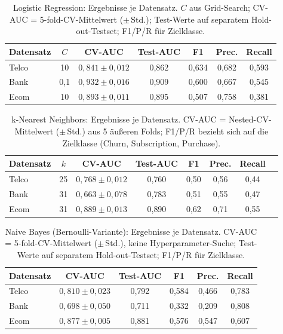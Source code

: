 \documentclass[10pt]{scrartcl}
\begin{document}
\begin{table}[H]
\centering
\footnotesize
\setlength{\tabcolsep}{4pt}
\caption{Logistic Regression: Ergebnisse je Datensatz. $C$ aus Grid-Search; CV-AUC = 5-fold-CV-Mittelwert ($\pm$\,Std.); Test-Werte auf separatem Hold-out-Testset; F1/P/R für Zielklasse.}\label{tab:logreg-results}
\begin{tabular}{lcccccc}
\toprule
Datensatz & $C$ & CV-AUC & Test-AUC & F1 & Prec. & Recall \\
\midrule
Telco & 10 & $0{,}841 \pm 0{,}012$ & 0{,}862 & 0{,}634 & 0{,}682 & 0{,}593 \\
Bank  & 0,1 & $0{,}932 \pm 0{,}016$ & 0{,}909 & 0{,}600 & 0{,}667 & 0{,}545 \\
Ecom  & 10 & $0{,}893 \pm 0{,}011$ & 0{,}895 & 0{,}507 & 0{,}758 & 0{,}381 \\
\bottomrule
\end{tabular}
\end{table}

\begin{table}[H]
\centering
\footnotesize
\setlength{\tabcolsep}{4pt}
\caption{k-Nearest Neighbors: Ergebnisse je Datensatz. CV-AUC = Nested-CV-Mittelwert ($\pm$\,Std.) aus 5 äußeren Folds; F1/P/R bezieht sich auf die Zielklasse (Churn, Subscription, Purchase).}\label{tab:knn-results}
\begin{tabular}{lccccccc}
\toprule
Datensatz & $k$ & CV-AUC & Test-AUC & F1 & Prec. & Recall \\
\midrule
Telco   & 25 & $0{,}768 \pm 0{,}012$ & 0{,}760 & 0{,}50 & 0{,}56 & 0{,}44 \\
Bank    & 31 & $0{,}663 \pm 0{,}078$ & 0{,}783 & 0{,}51 & 0{,}55 & 0{,}47 \\
Ecom    & 31 & $0{,}889 \pm 0{,}013$ & 0{,}890 & 0{,}62 & 0{,}71 & 0{,}55 \\
\bottomrule
\end{tabular}
\end{table}

\begin{table}[H]
\centering
\footnotesize
\setlength{\tabcolsep}{4pt}
\caption{Naive Bayes (Bernoulli-Variante): Ergebnisse je Datensatz. CV-AUC = 5-fold-CV-Mittelwert ($\pm$\,Std.), keine Hyperparameter-Suche; Test-Werte auf separatem Hold-out-Testset; F1/P/R für Zielklasse.}\label{tab:nb-results}
\begin{tabular}{lccccc}
\toprule
Datensatz & CV-AUC & Test-AUC & F1 & Prec. & Recall \\
\midrule
Telco & $0{,}810 \pm 0{,}023$ & 0{,}792 & 0{,}584 & 0{,}466 & 0{,}783 \\
Bank  & $0{,}698 \pm 0{,}050$ & 0{,}711 & 0{,}332 & 0{,}209 & 0{,}808 \\
Ecom  & $0{,}877 \pm 0{,}005$ & 0{,}881 & 0{,}576 & 0{,}547 & 0{,}607 \\
\bottomrule
\end{tabular}
\end{table}
\end{document}
